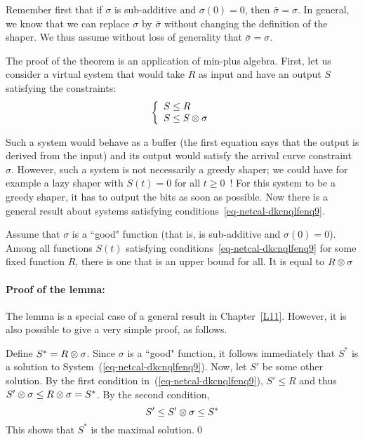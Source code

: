 \pr Remember first that if $\sigma$ is sub-additive and
$\sigma(0)=0$, then $ \bar{\sigma} = \sigma$.  In general, we know
that we can replace $\sigma$ by $\bar{\sigma}$ without changing
the definition of the shaper.  We thus assume without loss of
generality that $\bar{\sigma} = \sigma$.

The proof of the theorem is an application of min-plus algebra.
First, let us consider a virtual system that would take $R$ as
input and have an output $S$ satisfying the constraints:
\begin{equation}
    \left \{
    \begin{array}{l}
         S  \leq  R \\
        S  \leq S \mpc \sigma
    \end{array}
    \right .
    \mylabel{eq-netcal-dkcnqlfenq9}
\end{equation}

Such a system would behave as a buffer (the first equation says
that the output is derived from the input) and its output would
satisfy the arrival curve constraint $\sigma$.  However, such a
system is not necessarily a greedy shaper; we could have for
example a lazy shaper with $S(t)=0$ for all $t\geq 0$~!  For this
system to be a greedy shaper, it has to output the bits as soon as
possible.  Now there is a general result about systems satisfying
conditions~\ref{eq-netcal-dkcnqlfenq9}.
 \begin{lemma}
 Assume that $\sigma$ is a ``good" function
 (that is, is sub-additive and $\sigma(0)=0$).
 Among all functions $S(t)$ satisfying
 conditions~\ref{eq-netcal-dkcnqlfenq9} for some fixed function $R$,
 there is one that is an
 upper bound for all. It is equal to $R \otimes \sigma$
 \end{lemma}
 \paragraph{Proof of the lemma:} The lemma is a special case of a
 general result in Chapter~\ref{L11}. However, it is also possible
 to give a very simple proof, as follows.

Define $S^*=R \otimes \sigma$. Since $\sigma$ is a ``good" function,
it follows immediately that $S^*$ is a solution to
System~(\ref{eq-netcal-dkcnqlfenq9}). Now, let $S'$ be some other
solution. By the first condition in~(\ref{eq-netcal-dkcnqlfenq9}), $S'\leq R$ and thus $S'\otimes \sigma\leq R\otimes \sigma=S^*$. By the second condition,
 $$S'\leq S' \otimes \sigma \leq S^{*}$$
This shows that $S^{*}$ is the maximal solution.\qed

